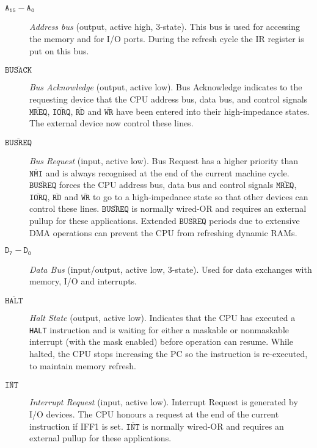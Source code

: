 \documentclass[oneside,a4paper]{book}
\begin{document}
\begin{description}

\item[$\mathtt{A_{15}-A_0}$] 
  {\em Address bus} (output, active high, 3-state). This bus is used for 
  accessing the memory and for I/O ports. During the refresh cycle the IR 
  register is put on this bus.

\item[$\mathtt{\overline{BUSACK}}$]
  {\em Bus Acknowledge} (output, active low). Bus Acknowledge indicates 
  to the requesting device that the CPU address bus, data bus, and control
  signals $\mathtt{\overline{MREQ}}$, 
  $\mathtt{\overline{IORQ}}$, 
  $\mathtt{\overline{RD}}$ and $\mathtt{\overline{WR}}$ have been entered into
  their high-impedance states. The external device now control these lines.

\item[$\mathtt{\overline{BUSREQ}}$]
  {\em Bus Request} (input, active low). Bus Request has a higher priority than
  $\mathtt{\overline{NMI}}$ and is always recognised at the end of the current
  machine cycle. $\mathtt{\overline{BUSREQ}}$ forces the CPU address bus, data
  bus and control signals $\mathtt{\overline{MREQ}}$,  
  $\mathtt{\overline{IORQ}}$, 
  $\mathtt{\overline{RD}}$ and $\mathtt{\overline{WR}}$ to go to a 
  high-impedance state so that other devices can control these lines. 
  $\mathtt{\overline{BUSREQ}}$ is normally wired-OR and requires an external 
  pullup for these applications. Extended $\mathtt{\overline{BUSREQ}}$ 
  periods due to extensive DMA operations can prevent the CPU from refreshing
  dynamic RAMs.

\item[$\mathtt{D_7-D_0}$]
  {\em Data Bus} (input/output, active low, 3-state). Used for data exchanges
  with memory, I/O and interrupts.

\item[$\mathtt{\overline{HALT}}$]
  {\em Halt State} (output, active low). Indicates that the CPU has executed 
  a {\tt HALT} instruction and is waiting for either a maskable or nonmaskable 
  interrupt (with the mask enabled) before operation can resume. While halted,
  the CPU stops increasing the PC so the instruction is re-executed, to
  maintain memory refresh.

\item[$\mathtt{\overline{INT}}$]
  {\em Interrupt Request} (input, active low). Interrupt Request is generated
  by I/O devices. The CPU honours a request at the end of the current 
  instruction if IFF1 is set. $\mathtt{\overline{INT}}$ is normally wired-OR
  and requires an external pullup for these applications.


\end{description}
\end{document}
